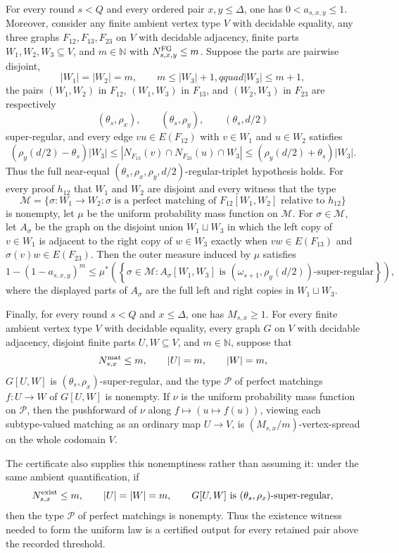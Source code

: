\begin{definition}
For every round $s<Q$ and every ordered pair $x,y\leq\Delta$, one has $0<a_{s,x,y}\leq1$.  Moreover, consider any
finite ambient vertex type $V$ with decidable equality, any three graphs
$F_{12},F_{13},F_{23}$ on $V$ with decidable adjacency, finite parts
$W_1,W_2,W_3\subseteq V$, and $m\in\mathbb N$ with
$N^{\rm FG}_{s,x,y}\leq m$.  Suppose the parts are pairwise disjoint,
\[
 |W_1|=|W_2|=m,\qquad m\leq |W_3|+1,qquad |W_3|\leq m+1,
\]
the pairs $(W_1,W_2)$ in $F_{12}$, $(W_1,W_3)$ in $F_{13}$, and
$(W_2,W_3)$ in $F_{23}$ are respectively
\[
 (\theta_s,\rho_x),\qquad (\theta_s,\rho_y),\qquad (\theta_s,d/2)
\]
super-regular, and every edge $vu\in E(F_{12})$ with $v\in W_1$ and
$u\in W_2$ satisfies
\[
 (\rho_y(d/2)-\theta_s)|W_3|
 \leq |N_{F_{13}}(v)\cap N_{F_{23}}(u)\cap W_3|
 \leq (\rho_y(d/2)+\theta_s)|W_3|.
\]
Thus the full near-equal $(\theta_s,\rho_x,\rho_y,d/2)$-regular-triplet
hypothesis holds.  For every proof $h_{12}$ that $W_1$ and $W_2$ are
disjoint and every witness that the type
\[
 \mathcal M=\{\sigma:W_1\to W_2:\sigma\text{ is a perfect matching of }
 F_{12}[W_1,W_2]\text{ relative to }h_{12}\}
\]
is nonempty, let $\mu$ be the uniform probability mass function on
$\mathcal M$.  For $\sigma\in\mathcal M$, let $A_\sigma$ be the graph on the
disjoint union $W_1\sqcup W_3$ in which the left copy of $v\in W_1$ is
adjacent to the right copy of $w\in W_3$ exactly when
$vw\in E(F_{13})$ and $\sigma(v)w\in E(F_{23})$.  Then the outer measure
induced by $\mu$ satisfies
\[
 1-(1-a_{s,x,y})^m\leq
 \mu^{*}\!\left(\left\{\sigma\in\mathcal M:
 A_\sigma[W_1,W_3]\text{ is }
 (\omega_{s+1},\rho_y(d/2))\text{-super-regular}\right\}\right),
\]
where the displayed parts of $A_\sigma$ are the full left and right copies
in $W_1\sqcup W_3$.

Finally, for every round $s<Q$ and $x\leq\Delta$, one has $M_{s,x}\geq1$.  For every finite
ambient vertex type $V$ with decidable equality, every graph $G$ on $V$ with
decidable adjacency, disjoint finite parts $U,W\subseteq V$, and
$m\in\mathbb N$, suppose that
\[
 N^{\rm mat}_{s,x}\leq m,\qquad |U|=m,\qquad |W|=m,
\]
$G[U,W]$ is $(\theta_s,\rho_x)$-super-regular, and the type $\mathcal P$ of
perfect matchings $f:U\to W$ of $G[U,W]$ is nonempty.  If $\nu$ is the
uniform probability mass function on $\mathcal P$, then the pushforward of
$\nu$ along $f\mapsto (u\mapsto f(u))$, viewing each subtype-valued matching
as an ordinary map $U\to V$, is $(M_{s,x}/m)$-vertex-spread on the whole
codomain $V$.

The certificate also supplies this nonemptiness rather than assuming it:
under the same ambient quantification, if
\[
 N^{\rm exist}_{s,x}\leq m,\qquad |U|=|W|=m,
 \qquad G[U,W]\text{ is }(\theta_s,\rho_x)\text{-super-regular},
\]
then the type $\mathcal P$ of perfect matchings is nonempty.  Thus the
existence witness needed to form the uniform law is a certified output for
every retained pair above the recorded threshold.
\end{definition}

